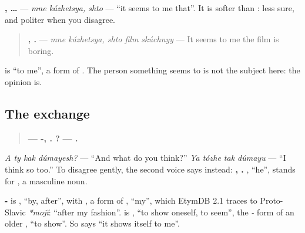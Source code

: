 \begin{grammarlens}[title={Grammar Lens: \ru{мне} \ru{кажется}, \ru{что} …}]
\textbf{ ,  …} — \emph{mne kázhetsya, shto} — \textquotedblleft{}it seems to me that\textquotedblright{}. It is softer than \emph{ }: less sure, and politer when you disagree.

\begin{quote}
\textbf{ ,   .} — \emph{mne kázhetsya, shto film skúchnyy} — It seems to me the film is boring.
\end{quote}

\textbf{} is \textquotedblleft{}to me\textquotedblright{}, a form of \emph{}. The person something seems to is not the subject here: the opinion is.
\end{grammarlens}

\subsection*{The exchange}
\begin{quote}
\textbf{— -,   .    ?} \textbf{—    .}
\end{quote}

\emph{A ty kak dúmayesh?} — \textquotedblleft{}And what do you think?\textquotedblright{} \emph{Ya tózhe tak dúmayu} — \textquotedblleft{}I think so too.\textquotedblright{} To disagree gently, the second voice says instead: \textbf{  ,   .} \emph{}, \textquotedblleft{}he\textquotedblright{}, stands for \emph{}, a masculine noun.

\begin{cousinweb}
\textbf{-} is \emph{}, \textquotedblleft{}by, after\textquotedblright{}, with \emph{}, a form of \textbf{}, \textquotedblleft{}my\textquotedblright{}, which EtymDB 2.1 traces to Proto-Slavic \emph{*mojĭ}: \textquotedblleft{}after my fashion\textquotedblright{}. \textbf{} is \emph{}, \textquotedblleft{}to show oneself, to seem\textquotedblright{}, the \emph{-} form of an older \emph{}, \textquotedblleft{}to show\textquotedblright{}. So \emph{ } says \textquotedblleft{}it shows itself to me\textquotedblright{}.
\end{cousinweb}

